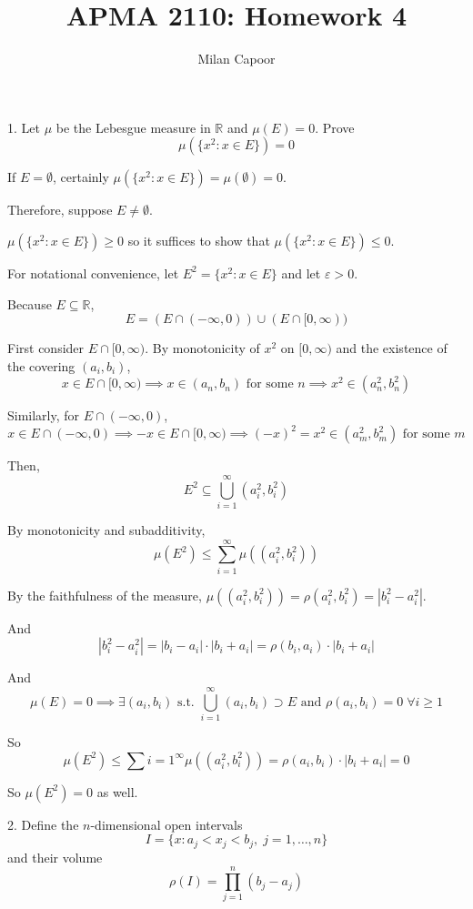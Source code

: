 \documentclass[12pt]{article}
\title{APMA 2110: Homework 4}
\author{Milan Capoor}
\date{}
\newcommand{\R}{\mathbb{R}}
\newcommand{\abs}[1]{\left\vert #1 \right\vert}
\newcommand{\ep}{\varepsilon}
\newcommand{\sub}{\subseteq}
\newcommand{\st}{\text{ s.t. }}
\begin{document}
\maketitle

1. Let $\mu$ be the Lebesgue measure in $\R$ and $\mu(E) = 0$. Prove 
\[\mu(\{x^2: x \in E\}) = 0\]

\color{blue}
    If $E = \emptyset$, certainly $\mu(\{x^2: x \in E\}) = \mu(\emptyset) = 0$.

    Therefore, suppose $E \neq \emptyset$.

    $\mu(\{x^2: x \in E\}) \geq 0$ so it suffices to show that $\mu(\{x^2: x \in E\}) \leq 0$.

    For notational convenience, let $E^2 = \{x^2: x \in E\}$ and let $\ep > 0$.

    Because $E \sub \R$, 
    \[E = (E \cap (-\infty, 0)) \cup (E \cap [0, \infty))\] 
    
    First consider $E \cap [0, \infty)$. By monotonicity of $x^2$ on $[0, \infty)$ and the existence of the covering $(a_i, b_i)$,
    \[x \in E \cap [0, \infty) \implies x \in (a_n, b_n) \text{ for some } n \implies x^2 \in (a_n^2, b_n^2)\]

    Similarly, for $E \cap (-\infty, 0)$,
    \[x \in E \cap (-\infty, 0) \implies -x \in E \cap [0, \infty) \implies (-x)^2 = x^2 \in (a_m^2, b_m^2) \text{ for some } m\]

    Then, 
    \[E^2 \sub \bigcup_{i=1}^\infty (a_i^2, b_i^2)\]

    By monotonicity and subadditivity, 
    \[\mu(E^2) \leq \sum_{i=1}^{\infty} \mu((a_i^2, b_i^2))\]

    By the faithfulness of the measure, $\mu((a_i^2, b_i^2)) = \rho(a_i^2, b_i^2) = \abs{b_i^2 - a_i^2}$.
    
    And 
    \[\abs{b_i^2 - a_i^2} = \abs{b_i - a_i} \cdot \abs{b_i + a_i} = \rho(b_i, a_i) \cdot \abs{b_i + a_i}\]

    And 
    \[\mu(E) = 0\implies \exists (a_i, b_i) \st \bigcup_{i=1}^\infty (a_i, b_i) \supset E \text{ and } \rho(a_i, b_i) = 0\;  \forall i\geq 1\]

    So 
    \[\mu(E^2) \leq \sum{i=1}^{\infty} \mu((a_i^2, b_i^2)) = \rho(a_i, b_i)\cdot \abs{b_i + a_i} = 0\]

    So $\mu(E^2) = 0$ as well.    
    
\color{black}

\pagebreak 

2. Define the $n$-dimensional open intervals 
\[I= \{x: a_j < x_j < b_j,\; j = 1, \dots, n\}\]
and their volume 
\[\rho(I) = \prod_{j=1}^n (b_j - a_j)\]
\end{document}
